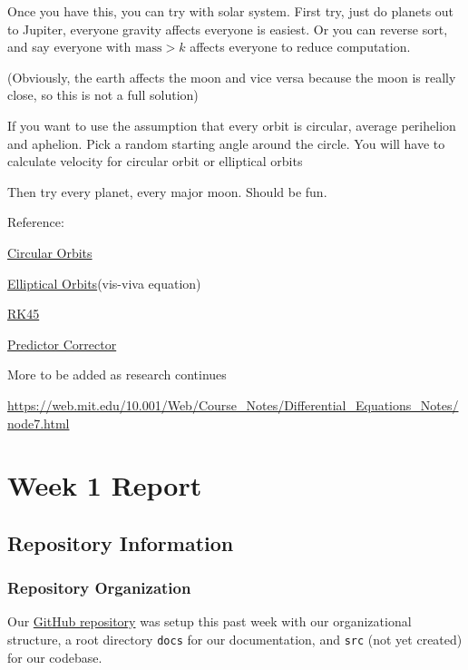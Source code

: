 \documentclass[12pt, letterpaper]{article}
\begin{document}
Once you have this, you can try with solar system. First try, just do planets out to Jupiter, everyone gravity affects everyone is easiest. Or  you can reverse sort, and say everyone with \(\text{mass} > k\) affects everyone to reduce computation.

(Obviously, the earth affects the moon and vice versa because the moon is really close, so this is not a full solution)

If you want to use the assumption that every orbit is circular, average perihelion and aphelion. Pick a random starting angle around the circle. You will have to calculate velocity for circular orbit or elliptical orbits

Then try every planet, every major moon. Should be fun.


Reference:

\href{https://www.physicsclassroom.com/class/circles/Lesson-4/Mathematics-of-Satellite-Motion#:~:text=The\%20orbital\%20speed\%20can\%20be,speed\%20of\%207780\%20m\%2Fs}{Circular Orbits}

\href{https://en.wikipedia.org/wiki/Elliptic_orbit}{Elliptical Orbits}(vis-viva equation)

\href{https://en.wikipedia.org/wiki/Runge\%E2\%80\%93Kutta\%E2\%80\%93Fehlberg_method}{RK45}

\href{https://en.wikipedia.org/wiki/Predictor\%E2\%80\%93corrector_method}{Predictor Corrector}

More to be added as research continues

\href{https://web.mit.edu/10.001/Web/Course\_Notes/Differential\_Equations_Notes/node7.html}{https://web.mit.edu/10.001/Web/Course\_Notes/Differential\_Equations_Notes/node7.html}


\section{Week 1 Report}
\subsection{Repository Information}
\subsubsection{Repository Organization}
Our \href{https://github.com/PMARINA/CPE593-FinalProject}{GitHub repository} was setup this past week with our organizational structure, a root directory \texttt{docs} for our documentation, and \texttt{src} (not yet created) for our codebase.
\end{document}
